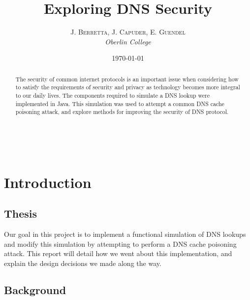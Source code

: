 \documentclass[a4paper, 12pt]{article} %
\title{\textbf{Exploring DNS Security}} %
\author{\textsc{J. Berretta, J. Capuder, E. Guendel} %
\\{\textit{Oberlin College}}} %
\date{\today} %
\makeatletter
\renewcommand{\maketitle}{ %
\begin{flushright} %
{\LARGE\@title} %

\vspace{30pt} %

{\large\@author} %
\\\@date %

\vspace{30pt} %
\end{flushright}
}
\makeatother
\begin{document}
\maketitle %



\begin{abstract}
The security of common internet protocols is an important issue when considering how to satisfy the requirements of security and privacy as technology becomes more integral to our daily lives. The components required to simulate a DNS lookup were implemented in Java. This simulation was used to attempt a common DNS cache poisoning attack, and explore methods for improving the security of DNS protocol.
\end{abstract}


\vspace{10pt} %


\section*{Introduction}

\subsection*{Thesis}

Our goal in this project is to implement a functional simulation of DNS lookups and modify this simulation by attempting to perform a DNS cache poisoning attack. This report will detail how we went about this implementation, and explain the design decisions we made along the way.

\subsection*{Background}
\end{document}
